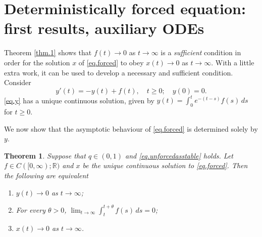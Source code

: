 \documentclass[a4paper,10pt,reqno]{amsart}
\numberwithin{equation}{section}
\newtheorem{theorem}{Theorem}
\theoremstyle{definition}
\theoremstyle{remark}
\DeclareMathOperator{\1}{\mathbbm 1}
\begin{document}
	\section{Deterministically forced equation: first results, auxiliary ODEs}
	Theorem \ref{thm.1} shows that $f(t)\to 0$ as $t\to\infty$ is a \textit{sufficient} condition in order for the solution $x$ of  \eqref{eq.forced} to obey $x(t)\to 0$ as $t\to\infty$. With a little extra work, it can be used to develop a necessary and sufficient condition. Consider  
	\begin{equation} \label{eq.y}
		y'(t)=-y(t)+f(t), \quad t\geq 0; \quad y(0)=0.
	\end{equation}  
	\eqref{eq.y} has a unique continuous solution, given by 
	$y(t)=\int_0^t e^{-(t-s)}f(s)\,ds$ for $t\geq 0$. 
	
	We now show that the asymptotic behaviour of \eqref{eq.forced} is determined solely by  $y$.
	\begin{theorem} \label{thm.detasymptoticstab}
		Suppose that $q\in (0,1)$ and \eqref{eq.unforcedasstable} holds. Let $f\in C([0,\infty);\mathbb{R})$ and $x$ be the unique continuous solution to  \eqref{eq.forced}. Then the following are equivalent
		\begin{enumerate}
			\item[(A)] $y(t)\to 0$ as $t\to\infty$;
			\item[(B)] For every $\theta>0$, $\lim_{t\to\infty} \int_t^{t+\theta} f(s)\,ds =0$;
			\item[(C)] $x(t)\to 0$ as $t\to\infty$. 
		\end{enumerate}
	\end{theorem}
\end{document}
